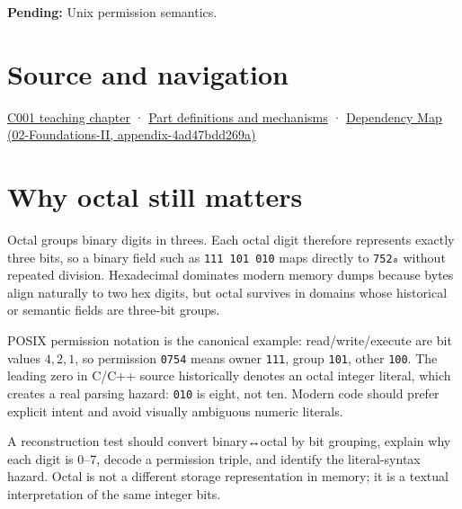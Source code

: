 \textbf{Pending:} Unix permission semantics.

\section{Source and navigation}\label{appendix-17fc1bc8b305-source-and-navigation}

\href{Continuous\%20Notes/Computing\%20Foundations\%20-\%20From\%20Bits\%20to\%20C++\%20and\%20Systems\%20APIs\#From\%20a\%20signal\%20to\%20an\%20interpretation}{C001 teaching chapter} · \hyperref[appendix-fd090d982a15]{Part definitions and mechanisms} · \href{../02-Foundations-II/main.pdf\#nameddest=appendix-4ad47bdd269a}{Dependency Map (02-Foundations-II, appendix-4ad47bdd269a)}

\section{Why octal still matters}\label{appendix-17fc1bc8b305-why-octal-still-matters}

Octal groups binary digits in threes. Each octal digit therefore represents exactly three bits, so a binary field such as \texttt{111\ 101\ 010} maps directly to \texttt{752₈} without repeated division. Hexadecimal dominates modern memory dumps because bytes align naturally to two hex digits, but octal survives in domains whose historical or semantic fields are three-bit groups.

POSIX permission notation is the canonical example: read/write/execute are bit values \(4,2,1\), so permission \texttt{0754} means owner \texttt{111}, group \texttt{101}, other \texttt{100}. The leading zero in C/C++ source historically denotes an octal integer literal, which creates a real parsing hazard: \texttt{010} is eight, not ten. Modern code should prefer explicit intent and avoid visually ambiguous numeric literals.

A reconstruction test should convert binary↔octal by bit grouping, explain why each digit is 0--7, decode a permission triple, and identify the literal-syntax hazard. Octal is not a different storage representation in memory; it is a textual interpretation of the same integer bits.

